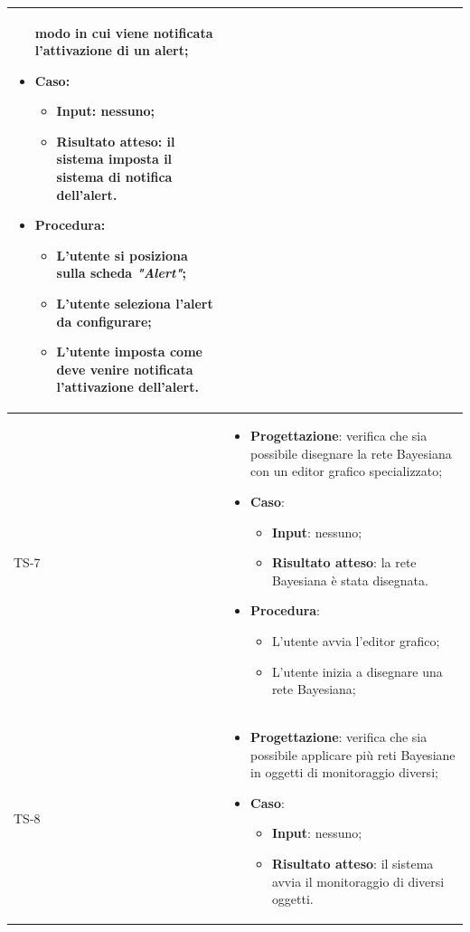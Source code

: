 \begin{longtable}{|C{2.5cm}|C{13cm}|}
\begin{itemize}
	modo in cui viene notificata l'attivazione di un alert;
	\item \textbf{Caso}: 
	\begin{itemize}
		\item \textbf{Input}: nessuno;
		\item \textbf{Risultato atteso}: il sistema imposta il sistema di notifica dell'alert.
	\end{itemize}
	\item \textbf{Procedura}:
	\begin{itemize}
		\item L'utente si posiziona sulla scheda \emph{"Alert"};
		\item L'utente seleziona l'alert da configurare;
		\item L'utente imposta come deve venire notificata l'attivazione dell'alert.
	\end{itemize} 
\end{itemize}
	 \\
	\hline
	{TS-7} & 
\begin{itemize}
	\item \textbf{Progettazione}: verifica che sia possibile disegnare la rete
	Bayesiana con un editor grafico specializzato;
	\item \textbf{Caso}: 
	\begin{itemize}
		\item \textbf{Input}: nessuno;
		\item \textbf{Risultato atteso}: la rete Bayesiana è stata disegnata.
	\end{itemize}
	\item \textbf{Procedura}:
	\begin{itemize}
		\item L'utente avvia l'editor grafico;
		\item L'utente inizia a disegnare una rete Bayesiana;
	\end{itemize} 
\end{itemize} \\
\hline
	{TS-8} & 
\begin{itemize}
	\item \textbf{Progettazione}: verifica che sia possibile applicare più reti
	Bayesiane in oggetti di monitoraggio diversi;
	\item \textbf{Caso}: 
	\begin{itemize}
		\item \textbf{Input}: nessuno;
		\item \textbf{Risultato atteso}: il sistema avvia il monitoraggio di diversi oggetti.

\end{itemize}
\end{itemize}
\end{longtable}
